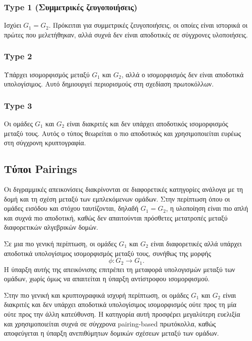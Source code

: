\documentclass[12pt,a4paper]{report}
\begin{document}
\subsubsection*{Type 1 (Συμμετρικές ζευγοποιήσεις)}

Ισχύει $G_1 = G_2$. Πρόκειται για συμμετρικές ζευγοποιήσεις, οι οποίες είναι ιστορικά οι πρώτες που μελετήθηκαν, αλλά συχνά δεν είναι αποδοτικές σε σύγχρονες υλοποιήσεις.

\subsubsection*{Type 2}

Υπάρχει ισομορφισμός μεταξύ $G_1$ και $G_2$, αλλά ο ισομορφισμός δεν είναι αποδοτικά υπολογίσιμος. Αυτό δημιουργεί περιορισμούς στη σχεδίαση πρωτοκόλλων.

\subsubsection*{Type 3}

Οι ομάδες $G_1$ και $G_2$ είναι διακριτές και δεν υπάρχει αποδοτικός ισομορφισμός μεταξύ τους. Αυτός ο τύπος θεωρείται ο πιο αποδοτικός και χρησιμοποιείται ευρέως στη σύγχρονη κρυπτογραφία.

\subsection{Τύποι Pairings}

Οι διγραμμικές απεικονίσεις διακρίνονται σε διαφορετικές κατηγορίες ανάλογα με τη δομή και τη σχέση μεταξύ των εμπλεκόμενων ομάδων. Στην περίπτωση όπου οι ομάδες εισόδου και στόχου ταυτίζονται, δηλαδή $G_1 = G_2$, η υλοποίηση είναι πιο απλή και συχνά πιο αποδοτική, καθώς δεν απαιτούνται πρόσθετες μετατροπές μεταξύ διαφορετικών αλγεβρικών δομών.

Σε μια πιο γενική περίπτωση, οι ομάδες $G_1$ και $G_2$ είναι διαφορετικές αλλά υπάρχει αποδοτικά υπολογίσιμος ισομορφισμός μεταξύ τους, συνήθως της μορφής
\[
\phi : G_2 \rightarrow G_1.
\]
Η ύπαρξη αυτής της απεικόνισης επιτρέπει τη μεταφορά υπολογισμών μεταξύ των ομάδων, χωρίς όμως να απαιτείται η ύπαρξη αντίστροφου ισομορφισμού.

Στην πιο γενική και κρυπτογραφικά ισχυρή περίπτωση, οι ομάδες $G_1$ και $G_2$ είναι διακριτές και δεν υπάρχει αποδοτικά υπολογίσιμος ισομορφισμός ούτε προς τη μία ούτε προς την άλλη κατεύθυνση. Η κατηγορία αυτή προσφέρει μεγαλύτερη ευελιξία και χρησιμοποιείται συχνά σε σύγχρονα pairing-based πρωτόκολλα, καθώς αποφεύγεται η ύπαρξη ανεπιθύμητων δομικών σχέσεων μεταξύ των ομάδων.
\end{document}
